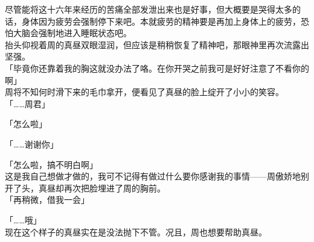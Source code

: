 尽管能将这十六年来经历的苦痛全部发泄出来也是好事，但大概要是哭得太多的话，身体因为疲劳会强制停下来吧。本就疲劳的精神要是再加上身体上的疲劳，恐怕大脑会强制地进入睡眠状态吧。\\

抬头仰视着周的真昼双眼湿润，但应该是稍稍恢复了精神吧，那眼神里再次流露出坚强。\\

「毕竟你还靠着我的胸这就没办法了咯。在你开哭之前我可是好好注意了不看你的啊」\\

周将不知何时滑下来的毛巾拿开，便看见了真昼的脸上绽开了小小的笑容。\\

「……周君」

「怎么啦」

「……谢谢你」

「怎么啦，搞不明白啊」\\

这是我自己想做才做的，我可不记得有做过什么要你感谢我的事情——周傲娇地别开了头，真昼却再次把脸埋进了周的胸前。\\

「再稍微，借我一会」

「……哦」\\

现在这个样子的真昼实在是没法抛下不管。况且，周也想要帮助真昼。\\

